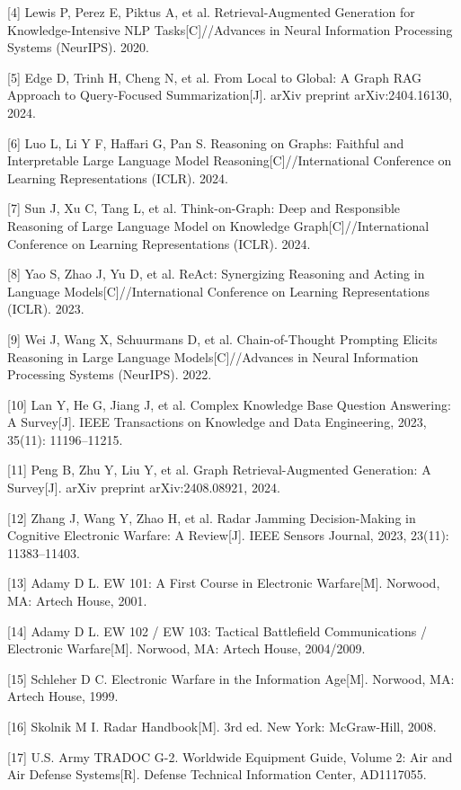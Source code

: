\documentclass[12pt,a4paper]{ctexart}
\begin{document}
[4] Lewis P, Perez E, Piktus A, et al. Retrieval-Augmented Generation for Knowledge-Intensive NLP Tasks[C]//Advances in Neural Information Processing Systems (NeurIPS). 2020.

[5] Edge D, Trinh H, Cheng N, et al. From Local to Global: A Graph RAG Approach to Query-Focused Summarization[J]. arXiv preprint arXiv:2404.16130, 2024.

[6] Luo L, Li Y F, Haffari G, Pan S. Reasoning on Graphs: Faithful and Interpretable Large Language Model Reasoning[C]//International Conference on Learning Representations (ICLR). 2024.

[7] Sun J, Xu C, Tang L, et al. Think-on-Graph: Deep and Responsible Reasoning of Large Language Model on Knowledge Graph[C]//International Conference on Learning Representations (ICLR). 2024.

[8] Yao S, Zhao J, Yu D, et al. ReAct: Synergizing Reasoning and Acting in Language Models[C]//International Conference on Learning Representations (ICLR). 2023.

[9] Wei J, Wang X, Schuurmans D, et al. Chain-of-Thought Prompting Elicits Reasoning in Large Language Models[C]//Advances in Neural Information Processing Systems (NeurIPS). 2022.

[10] Lan Y, He G, Jiang J, et al. Complex Knowledge Base Question Answering: A Survey[J]. IEEE Transactions on Knowledge and Data Engineering, 2023, 35(11): 11196–11215.

[11] Peng B, Zhu Y, Liu Y, et al. Graph Retrieval-Augmented Generation: A Survey[J]. arXiv preprint arXiv:2408.08921, 2024.

[12] Zhang J, Wang Y, Zhao H, et al. Radar Jamming Decision-Making in Cognitive Electronic Warfare: A Review[J]. IEEE Sensors Journal, 2023, 23(11): 11383–11403.

[13] Adamy D L. EW 101: A First Course in Electronic Warfare[M]. Norwood, MA: Artech House, 2001.

[14] Adamy D L. EW 102 / EW 103: Tactical Battlefield Communications / Electronic Warfare[M]. Norwood, MA: Artech House, 2004/2009.

[15] Schleher D C. Electronic Warfare in the Information Age[M]. Norwood, MA: Artech House, 1999.

[16] Skolnik M I. Radar Handbook[M]. 3rd ed. New York: McGraw-Hill, 2008.

[17] U.S. Army TRADOC G-2. Worldwide Equipment Guide, Volume 2: Air and Air Defense Systems[R]. Defense Technical Information Center, AD1117055.
\end{document}
